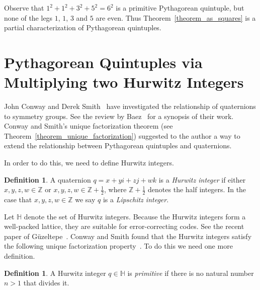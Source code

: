 \documentclass[12pt,table]{article}
\theoremstyle{definition}
\newtheorem{definition}[theorem]{Definition}
\theoremstyle{remark}
\newcommand{\Hhh}{\mathbb H}
\newcommand{\Zzz}{\mathbb Z}
\newcommand{\vanish}[1]{}
\numberwithin{equation}{section}
\begin{document}
\vanish{
\begin{eqnarray*}
     (ix+jy+kz+w)^2
      &=& -x^2+kxy-jxz+ixw-kxy-y^2+iyz+jyw\\
      & & + jxz-iyz-z^2+kzw+ixw+jyw+kzw+w^2\\
      &=& i(2xw)+j(2yw)+k(2zw)-(x^2+y^2+z^2-w^2)
\end{eqnarray*}
}

\noindent

Observe 
that
$1^2+ 1^2+ 3^2+ 5^2= 6^2$ is a 
primitive Pythagorean quintuple, but none of the
legs  $1$, $1$, $3$ and $5$ are even.
Thus Theorem~\ref{theorem_as_squares} is a partial characterization
of Pythagorean quintuples.




\section{Pythagorean Quintuples via Multiplying two Hurwitz Integers}

John Conway and Derek Smith~\cite{Conway_book}
have investigated the relationship of quaternions
to symmetry groups.  See the review by Baez~\cite{Baez}
for a synopsis of their work.
Conway and Smith's unique factorization theorem 
(see Theorem~\ref{theorem_unique_factorization}) suggested to
the author a way to extend
the relationship between Pythagorean quintuples
and quaternions.


In order to do this, we need to define Hurwitz integers.

\begin{definition}
A quaternion $q = x+yi+zj+wk$ is a
{\em Hurwitz integer}
if either $x, y, z, w \in \Zzz$ 
or
$x, y, z, w \in \Zzz + \frac{1}{2}$,
where
$\Zzz + \frac{1}{2}$ denotes the half integers.
In the case that
$x, y, z, w \in \Zzz$
we say $q$ is a {\em Lipschitz integer}.
\end{definition}
Let $\Hhh$ denote the set of Hurwitz integers.
Because the Hurwitz integers form a well-packed lattice,
they are suitable for error-correcting codes.
See the recent paper of G\"uzeltepe~\cite{Guzeltepe}.
Conway and Smith found that the Hurwitz integers satisfy
the following unique factorization 
property~\cite[Ch.\ 5, Theorem 2]{Conway_book}.
To do this we need one more definition.



\begin{definition}
A Hurwitz integer $q \in \Hhh$ is
{\em primitive} if there is no natural number $n > 1$ that divides it.
\end{definition}
\end{document}
